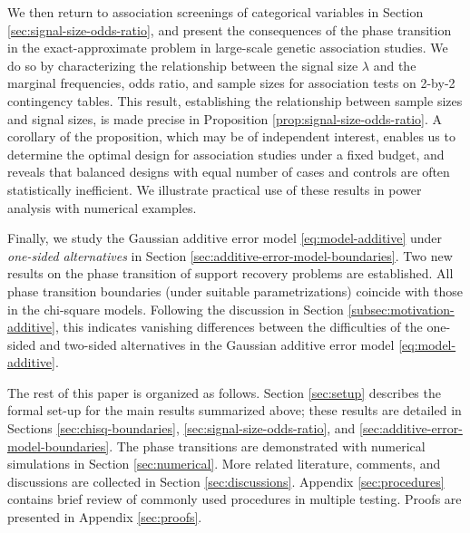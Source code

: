 We then return to association screenings of categorical variables in Section \ref{sec:signal-size-odds-ratio}, and 
present the consequences of the phase transition in the exact-approximate problem in large-scale genetic association studies.
We do so by characterizing the relationship between the signal size $\lambda$ and the marginal frequencies, odds ratio, and sample sizes for association tests on 2-by-2 contingency tables.
This result, establishing the relationship between sample sizes and signal sizes, is made precise in Proposition \ref{prop:signal-size-odds-ratio}.
A corollary of the proposition, which may be of independent interest, enables us to determine the optimal design for association studies under a fixed budget, and reveals that balanced designs with equal number of cases and controls are often statistically inefficient.
We illustrate practical use of these results in power analysis with numerical examples. 

Finally, we study the Gaussian additive error model \eqref{eq:model-additive} under \emph{one-sided alternatives} in Section \ref{sec:additive-error-model-boundaries}. 
Two new results on the phase transition of support recovery problems are established.
All phase transition boundaries (under suitable parametrizations) coincide with those in the chi-square models.
Following the discussion in Section \ref{subsec:motivation-additive}, this indicates vanishing differences between the difficulties of the one-sided and two-sided alternatives in the Gaussian additive error model \eqref{eq:model-additive}.

The rest of this paper is organized as follows. 
Section \ref{sec:setup} describes the formal set-up for the main results summarized above; these results are detailed in Sections \ref{sec:chisq-boundaries}, \ref{sec:signal-size-odds-ratio}, and \ref{sec:additive-error-model-boundaries}. 
The phase transitions are demonstrated with numerical simulations in Section \ref{sec:numerical}.
More related literature, comments, and discussions are collected in Section \ref{sec:discussions}.
Appendix \ref{sec:procedures} contains brief review of commonly used procedures in multiple testing.
Proofs are presented in Appendix \ref{sec:proofs}.


